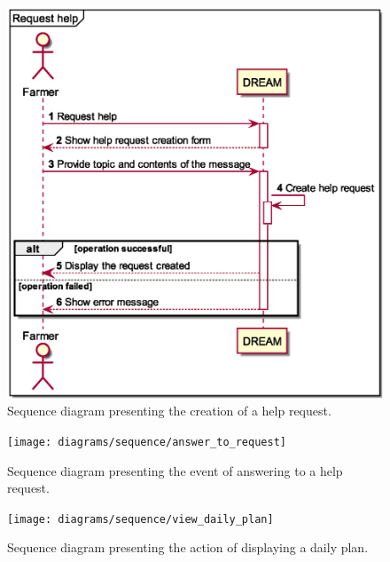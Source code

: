 \begin{figure}[H]
    \centering
    \includegraphics[scale=0.6, keepaspectratio, origin=c]{diagrams/sequence/request_help}
    \caption{Sequence diagram presenting the creation of a help request.}
    \label{fig:sd_request_help}
\end{figure}

\begin{figure}[H]
    \centering
    \texttt{[image: diagrams/sequence/answer\_to\_request]}
    \caption{Sequence diagram presenting the event of answering to a help request.}
    \label{fig:sd_answer_to_request}
\end{figure}

\begin{figure}[H]
    \centering
    \texttt{[image: diagrams/sequence/view\_daily\_plan]}
    \caption{Sequence diagram presenting the action of displaying a daily plan.}
    \label{fig:sd_view_daily_plan}
\end{figure}

